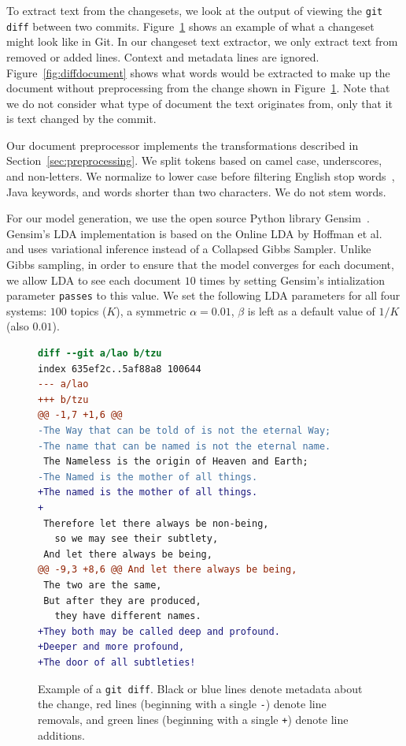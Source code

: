 To extract text from the changesets, we look at the output of viewing
the \texttt{git diff} between two commits.
Figure~\ref{fig:diff} shows an example of what a changeset might look
like in Git.
In our changeset text extractor, we only extract text from removed or added lines.
Context and metadata lines are ignored.
Figure~\ref{fig:diffdocument} shows what words would be extracted to make up the document without preprocessing
from the change shown in Figure~\ref{fig:diff}.
Note that we do not consider what type of document the text originates from,
only that it is text changed by the commit.

Our document preprocessor implements the transformations described in Section~\ref{sec:preprocessing}.
We split tokens based on camel case, underscores, and non-letters.
We normalize to lower case before filtering English stop words~\cite{StopWords}, Java keywords, and words shorter than two characters.
We do not stem words.


For our model generation, we use the open source Python library Gensim~\cite{Gensim}.
Gensim's LDA implementation is based on the Online LDA by Hoffman et al.~\cite{Hoffman-etal:2010}
and uses variational inference instead of a Collapsed Gibbs Sampler.
Unlike Gibbs sampling, in order to ensure that the model converges for each document,
we allow LDA to see each document $10$ times by setting Gensim's intialization parameter \texttt{passes} to this value.
We set the following LDA parameters for all four systems:
$100$ topics ($K$),
a symmetric $\alpha=0.01$,
$\beta$ is left as a default value of $1/K$ (also $0.01$).


\begin{figure}[ht]
\centering
\footnotesize
\begin{lstlisting}[language=diff, basicstyle=\ttfamily]
diff --git a/lao b/tzu
index 635ef2c..5af88a8 100644
--- a/lao
+++ b/tzu
@@ -1,7 +1,6 @@
-The Way that can be told of is not the eternal Way;
-The name that can be named is not the eternal name.
 The Nameless is the origin of Heaven and Earth;
-The Named is the mother of all things.
+The named is the mother of all things.
+
 Therefore let there always be non-being,
   so we may see their subtlety,
 And let there always be being,
@@ -9,3 +8,6 @@ And let there always be being,
 The two are the same,
 But after they are produced,
   they have different names.
+They both may be called deep and profound.
+Deeper and more profound,
+The door of all subtleties!
\end{lstlisting}
\caption{Example of a \texttt{git diff}. Black or blue lines denote metadata about the change, red lines (beginning with a single \texttt{-}) denote line removals, and green lines (beginning with a single \texttt{+}) denote line additions.}
\label{fig:diff}
\end{figure}

